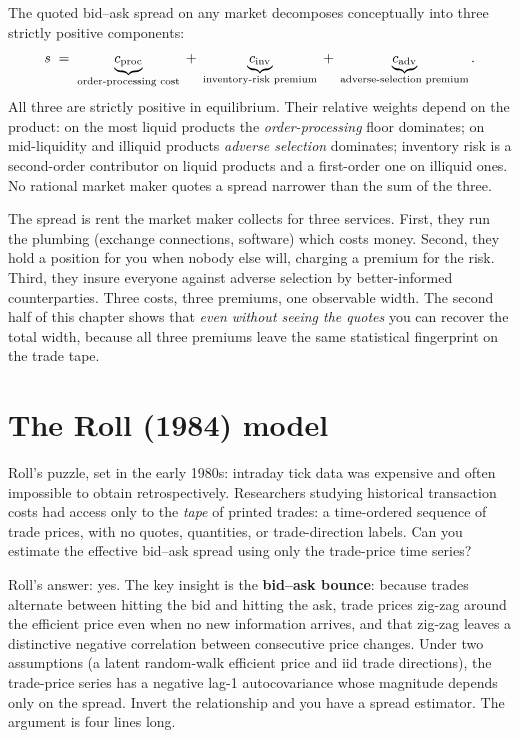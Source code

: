 \begin{keyfactbox}
The quoted bid--ask spread on any market decomposes conceptually
into three strictly positive components:
\[
  s \;=\; \underbrace{c_{\text{proc}}}_{\text{order-processing cost}}
         \;+\; \underbrace{c_{\text{inv}}}_{\text{inventory-risk premium}}
         \;+\; \underbrace{c_{\text{adv}}}_{\text{adverse-selection premium}}.
\]
All three are strictly positive in equilibrium. Their relative
weights depend on the product: on the most liquid products the
\emph{order-processing} floor dominates; on mid-liquidity and
illiquid products \emph{adverse selection} dominates; inventory
risk is a second-order contributor on liquid products and a
first-order one on illiquid ones. No rational market maker quotes
a spread narrower than the sum of the three.
\end{keyfactbox}

\begin{intuitionbox}
The spread is rent the market maker collects for three services.
First, they run the plumbing (exchange connections, software)
which costs money. Second, they hold a position for you when
nobody else will, charging a premium for the risk. Third, they
insure everyone against adverse selection by better-informed
counterparties. Three costs, three premiums, one observable width.
The second half of this chapter shows that \emph{even without
seeing the quotes} you can recover the total width, because all
three premiums leave the same statistical fingerprint on the trade
tape.
\end{intuitionbox}

\section{The Roll (1984) model}
\label{sec:roll_model}

Roll's puzzle, set in the early 1980s: intraday tick data was
expensive and often impossible to obtain retrospectively.
Researchers studying historical transaction costs had access only
to the \emph{tape} of printed trades: a time-ordered sequence
of trade prices, with no quotes, quantities, or trade-direction
labels. Can you estimate the effective bid--ask spread using only
the trade-price time series?

Roll's answer: yes. The key insight is the \textbf{bid--ask
bounce}: because trades alternate between hitting the bid and
hitting the ask, trade prices zig-zag around the efficient price
even when no new information arrives, and that zig-zag leaves a
distinctive negative correlation between consecutive price
changes. Under two assumptions (a latent random-walk
efficient price and iid trade directions), the trade-price
series has a negative lag-1 autocovariance whose magnitude depends
only on the spread. Invert the relationship and you have a spread
estimator. The argument is four lines long.


